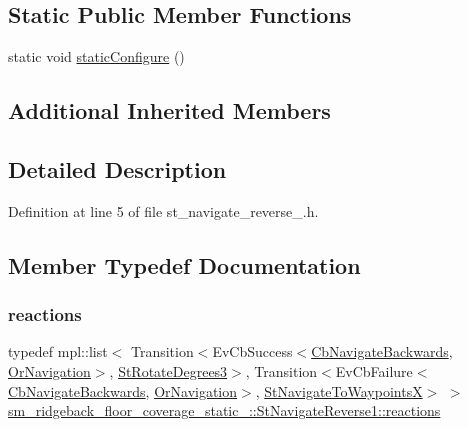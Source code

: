 \subsection*{Static Public Member Functions}
\begin{DoxyCompactItemize}
\item 
static void \hyperlink{structsm__ridgeback__floor__coverage__static__1_1_1StNavigateReverse1_a82ffadad5cd2112d6e79b54ca1344ec4}{static\+Configure} ()
\end{DoxyCompactItemize}
\subsection*{Additional Inherited Members}


\subsection{Detailed Description}


Definition at line 5 of file st\+\_\+navigate\+\_\+reverse\+\_.\+h.



\subsection{Member Typedef Documentation}
\mbox{\label{structsm__ridgeback__floor__coverage__static__1_1_1StNavigateReverse1_a19065bdd460dc7dbf1859a30691425f2}} 
\subsubsection{\texorpdfstring{reactions}{reactions}}
{\footnotesize\ttfamily typedef mpl\+::list$<$ Transition$<$Ev\+Cb\+Success$<$\hyperlink{classcl__move__base__z_1_1CbNavigateBackwards}{Cb\+Navigate\+Backwards}, \hyperlink{classsm__ridgeback__floor__coverage__static__1_1_1OrNavigation}{Or\+Navigation}$>$, \hyperlink{structsm__ridgeback__floor__coverage__static__1_1_1StRotateDegrees3}{St\+Rotate\+Degrees3}$>$, Transition$<$Ev\+Cb\+Failure$<$\hyperlink{classcl__move__base__z_1_1CbNavigateBackwards}{Cb\+Navigate\+Backwards}, \hyperlink{classsm__ridgeback__floor__coverage__static__1_1_1OrNavigation}{Or\+Navigation}$>$, \hyperlink{structsm__ridgeback__floor__coverage__static__1_1_1StNavigateToWaypointsX}{St\+Navigate\+To\+WaypointsX}$>$ $>$ \hyperlink{structsm__ridgeback__floor__coverage__static__1_1_1StNavigateReverse1_a19065bdd460dc7dbf1859a30691425f2}{sm\+\_\+ridgeback\+\_\+floor\+\_\+coverage\+\_\+static\+\_\+::\+St\+Navigate\+Reverse1\+::reactions}}



